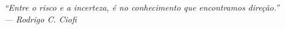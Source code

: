 \cleardoublepage
\thispagestyle{empty}

\vspace*{0.65\textheight}
\begin{flushright}
\itshape
“Entre o risco e a incerteza, é no conhecimento que encontramos direção.”\\
\medskip
— Rodrigo C. Ciofi
\end{flushright}
